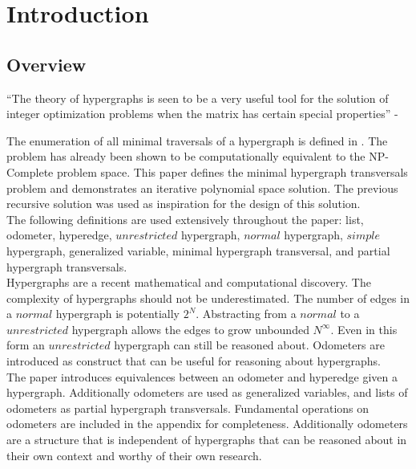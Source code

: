 \chapter{Introduction}
\section{Overview}
``The theory of hypergraphs is seen to be a very useful tool for the solution of integer optimization problems when the matrix has certain special properties'' - \cite{berge1984hypergraphs}

The enumeration of all minimal traversals of a hypergraph is  defined in \cite{berge1984hypergraphs}. The problem has already been shown to be computationally equivalent to the NP-Complete problem space. \cite{eiter1991transveral} This paper defines the minimal hypergraph transversals problem and demonstrates an iterative polynomial space solution. The previous recursive solution \cite{kavvadias2005efficient} was used as inspiration for the design of this solution.\\

The following definitions are used extensively throughout the paper: list, odometer, hyperedge, $unrestricted$ hypergraph, $normal$ hypergraph, $simple$ hypergraph, generalized variable, minimal hypergraph transversal, and partial hypergraph transversals.\\


Hypergraphs are a recent mathematical and computational discovery. The complexity of hypergraphs should not be underestimated. The number of edges in a $normal$ hypergraph is potentially $2^N$. Abstracting from a $normal$ to a $unrestricted$ hypergraph allows the edges to grow unbounded $N^\infty$. Even in this form an $unrestricted$ hypergraph can still be reasoned about. Odometers \cite{Odometer:Fuchs} are introduced as construct that can be useful for reasoning about hypergraphs. \\


The paper introduces equivalences between an odometer and hyperedge given a hypergraph. Additionally odometers are used as generalized variables, and lists of odometers as partial hypergraph transversals. Fundamental operations on odometers are included in the appendix for completeness. Additionally odometers are a structure that is independent of hypergraphs that can be reasoned about in their own context and worthy of their own research.\\

